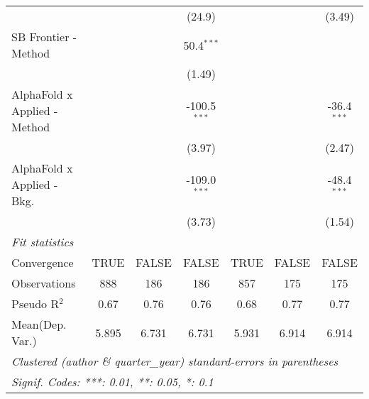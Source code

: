 \begin{tabular}{lcccccc}
                                &               &                & (24.9)         &               &               & (3.49)\\   
   SB Frontier - Method         &               &                & 50.4$^{***}$   &               &               &   \\   
                                &               &                & (1.49)         &               &               &   \\   
   AlphaFold x Applied - Method &               &                & -100.5$^{***}$ &               &               & -36.4$^{***}$\\   
                                &               &                & (3.97)         &               &               & (2.47)\\   
   AlphaFold x Applied - Bkg.   &               &                & -109.0$^{***}$ &               &               & -48.4$^{***}$\\   
                                &               &                & (3.73)         &               &               & (1.54)\\   
   \midrule
   \emph{Fit statistics}\\
   Convergence                  &TRUE           & FALSE          & FALSE          & TRUE          & FALSE         & FALSE\\  
   Observations                 & 888           & 186            & 186            & 857           & 175           & 175\\  
   Pseudo R$^2$                 & 0.67          & 0.76           & 0.76           & 0.68          & 0.77          & 0.77\\  
Mean(Dep. Var.) & 5.895 & 6.731 & 6.731 & 5.931 & 6.914 & 6.914 \\
   \midrule \midrule
   \multicolumn{7}{l}{\emph{Clustered (author \& quarter\_year) standard-errors in parentheses}}\\
   \multicolumn{7}{l}{\emph{Signif. Codes: ***: 0.01, **: 0.05, *: 0.1}}\\
\end{tabular}
\par\endgroup

